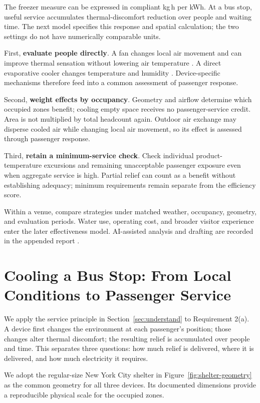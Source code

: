 \documentclass[12pt]{article}
\begin{document}
The freezer measure can be expressed in compliant kg\,h per kWh. At a bus stop, useful service accumulates thermal-discomfort reduction over people and waiting time. The next model specifies this response and spatial calculation; the two settings do not have numerically comparable units.

First, \textbf{evaluate people directly}. A fan changes local air movement and can improve thermal sensation without lowering air temperature \cite{energystar}. A direct evaporative cooler changes temperature and humidity \cite{evap}. Device-specific mechanisms therefore feed into a common assessment of passenger response.

Second, \textbf{weight effects by occupancy}. Geometry and airflow determine which occupied zones benefit; cooling empty space receives no passenger-service credit. Area is not multiplied by total headcount again. Outdoor air exchange may disperse cooled air while changing local air movement, so its effect is assessed through passenger response.

Third, \textbf{retain a minimum-service check}. Check individual product-temperature excursions and remaining unacceptable passenger exposure even when aggregate service is high. Partial relief can count as a benefit without establishing adequacy; minimum requirements remain separate from the efficiency score.

Within a venue, compare strategies under matched weather, occupancy, geometry, and evaluation periods. Water use, operating cost, and broader visitor experience enter the later effectiveness model. AI-assisted analysis and drafting are recorded in the appended report \cite{codex}.

\clearpage
\section{Cooling a Bus Stop: From Local Conditions to Passenger Service}
\label{sec:bus}

We apply the service principle in Section~\ref{sec:understand} to Requirement 2(a). A device first changes the environment at each passenger's position; those changes alter thermal discomfort; the resulting relief is accumulated over people and time. This separates three questions: how much relief is delivered, where it is delivered, and how much electricity it requires.


We adopt the regular-size New York City shelter in Figure~\ref{fig:shelter-geometry} as the common geometry for all three devices. Its documented dimensions provide a reproducible physical scale for the occupied zones.
\end{document}
